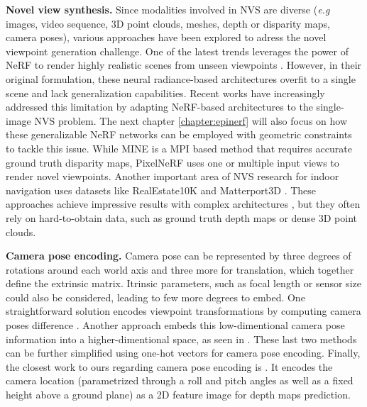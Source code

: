 \noindent\textbf{Novel view synthesis.} Since modalities involved in \ac{NVS} are diverse (\textit{e.g} images, video sequence, 3D point clouds, meshes, depth or disparity maps, camera poses), various approaches have been explored to adress the novel viewpoint generation challenge. One of the latest trends leverages the power of \ac{NeRF} \citep{mildenhall2020nerf} to render highly realistic scenes from unseen viewpoints \citep{wang2021neus,niemeyer2022regnerf,barron2022mip}. However, in their original formulation, these neural radiance-based  architectures overfit to a single scene and lack generalization capabilities. Recent works \citep{yu2021pixelnerf,li2021mine} have increasingly addressed this limitation by adapting NeRF-based architectures to the single-image \ac{NVS} problem. The next chapter \ref{chapter:epinerf} will also focus on how these generalizable \ac{NeRF} networks can be employed with geometric constraints to tackle this issue. While MINE \citep{li2021mine} is a \ac{MPI} based method that requires accurate ground truth disparity maps, PixelNeRF \citep{yu2021pixelnerf} uses one or multiple input views to render novel viewpoints. Another important area of \ac{NVS} research for indoor navigation uses datasets like RealEstate10K \citep{zhou2018stereo} and Matterport3D \citep{zhao2021camera}. These approaches achieve impressive results with complex architectures \citep{wiles2020synsin,rombach2021geometry,rockwell2021pixelsynth}, but they often rely on hard-to-obtain data, such as ground truth depth maps or dense 3D point clouds. \newline

\noindent\textbf{Camera pose encoding.} Camera pose can be represented by three degrees of rotations around each world axis and three more for translation, which together define the extrinsic matrix.  Itrinsic parameters, such as focal length or sensor size could also be considered, leading to few more degrees to embed. One straightforward solution encodes viewpoint transformations by computing camera poses difference \citep{sun2018multiview}. Another approach embeds this low-dimentional camera pose information into a higher-dimentional space, as seen in \citep{kim2020novel,rombach2021geometry}. These last two methods can be further simplified using one-hot vectors for camera pose encoding. Finally, the closest work to ours regarding camera pose encoding is \citep{zhao2021camera}. It encodes the camera location (parametrized through a roll and pitch angles as well as a fixed height above a ground plane) as a 2D feature image for depth maps prediction. \newline

